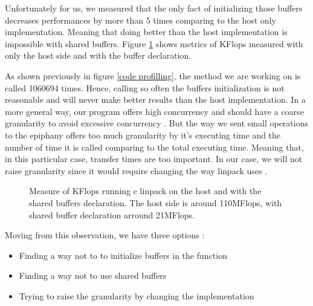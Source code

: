 Unfortunately for us, we measured that the only fact of initializing those buffers decreases performances by more than 5 times comparing to the host only implementation. Meaning that doing better than the host implementation is impossible with shared buffers. Figure \ref{graph flops decrease} shows metrics of KFlops measured with only the host side and with the buffer declaration.

As shown previously in figure \ref{code profilling}, the method we are working on is called 1060694 times. Hence, calling so often the buffers initialization is not reasonable and will never make better results than the host implementation. In a more general way, our program offers high concurrency and should have a coarse granularity to avoid excessive concurrency \cite{pie}. But the way we sent small operations to the \gls{epiphany} offers too much granularity by it's executing time and the number of time it is called comparing to the total executing time. Meaning that, in this particular case, transfer times are too important. In our case, we will not raise granularity since it would require changing the way linpack uses .

\begin{figure}[h!]
\centering
{}
\caption{Measure of KFlops running c linpack on the host and with the shared buffers declaration. The host side is around 110MFlops, with shared buffer declaration arround 21MFlops.}
\label{graph flops decrease}
\end{figure}

Moving from this observation, we have three options :

\begin{itemize}
  \item Finding a way not to to initialize buffers in the function
  \item Finding a way not to use shared buffers
  \item Trying to raise the granularity by changing the implementation
\end{itemize}

